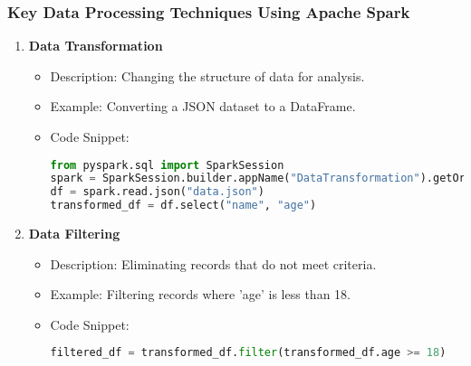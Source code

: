 \documentclass[aspectratio=169]{beamer}
\begin{document}
\begin{frame}[fragile]
    \frametitle{Key Data Processing Techniques Using Apache Spark}
    \begin{enumerate}
        \item \textbf{Data Transformation}
            \begin{itemize}
                \item Description: Changing the structure of data for analysis.
                \item Example: Converting a JSON dataset to a DataFrame.
                \item Code Snippet:
                \begin{lstlisting}[language=Python]
from pyspark.sql import SparkSession
spark = SparkSession.builder.appName("DataTransformation").getOrCreate()
df = spark.read.json("data.json")
transformed_df = df.select("name", "age")
                \end{lstlisting}
            \end{itemize}

        \item \textbf{Data Filtering}
            \begin{itemize}
                \item Description: Eliminating records that do not meet criteria.
                \item Example: Filtering records where 'age' is less than 18.
                \item Code Snippet:
                \begin{lstlisting}[language=Python]
filtered_df = transformed_df.filter(transformed_df.age >= 18)
                \end{lstlisting}
            \end{itemize}
    \end{enumerate}
\end{frame}
\end{document}
